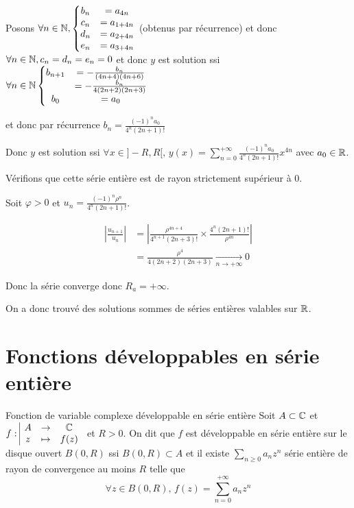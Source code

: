 \begin{exemple}
    Posons $\forall n \in \mathbb{N}, \left\{ 
        \begin{matrix}
            b_n & = a_{4 n } \\
            c_n & = a_{ 1 + 4n} \\
            d_n & = a_{2 + 4n} \\
            e_n & = a_{3 + 4n}
        \end{matrix}
    \right.$ (obtenus par récurrence) et donc 
    $\forall n \in \mathbb{N}, c_n = d_n = e_n = 0$ et donc $y$ est solution ssi 
    $\forall n \in \mathbb{N} \left\{
        \begin{matrix}
            b_{n + 1} & = - \frac{b_n }{(4n + 4)(4n + 6)} \\
            & = - \frac{b_n }{4(2n + 2)(2n + 3)} \\
            b_0 & = a_0
        \end{matrix}
    \right.$

    et donc par récurrence $ b_n = \frac{(-1)^n a_0}{4^n(2n + 1)!}$
    
    Donc $y$ est solution ssi $\forall x \in ]-R, R[, \, y(x) = \sum_{n = 0}^{+\infty} \frac{(-1)^n a_0}{4^n (2n + 1)!} x^{4n}$
    avec $a_0 \in \mathbb{R}$. 

    Vérifions que cette série entière est de rayon strictement supérieur à 0.

    Soit $\varphi > 0$ et $u_n = \frac{(-1)^n \rho^n}{4^n (2n + 1)!}$.

    \begin{align}
        \left| \frac{u_{n + 1}}{u_n} \right| & = \left| \frac{\rho^{4n + 4}}{4^{n + 1} (2n + 3)!} \times \frac{4^n (2n + 1)!}{\rho^{4n} } \right| \\
        & = \frac{\rho^4 }{4 (2n + 2)(2n + 3)} \xrightarrow[n \to + \infty]{} 0
    \end{align}

    Donc la série converge donc $R_a = + \infty$.

    On a donc trouvé des solutions sommes de séries entières valables sur $\mathbb{R}$.
\end{exemple}

\section{Fonctions développables en série entière}

\begin{definitionnt}{Fonction de variable complexe développable en série entière}{}
    Soit $A \subset \mathbb{C}$ et $f: \space \begin{array}{|ccc} \displaystyle A & \to & \displaystyle \mathbb{C} \\ \displaystyle z & \mapsto & \displaystyle f(z) \end{array}$ et $R > 0$. On dit que $f$ est développable
    en série entière sur le disque ouvert $B(0, R)$ ssi $B(0, R) \subset A$ et il 
    existe $\sum_{n \geqslant 0 } a_n z^n$ série entière de rayon de convergence au moins $R$ telle que
    $$\forall z \in B(0, R), \, f(z) = \sum_{n = 0}^{+\infty} a_n z^n$$
\end{definitionnt}

